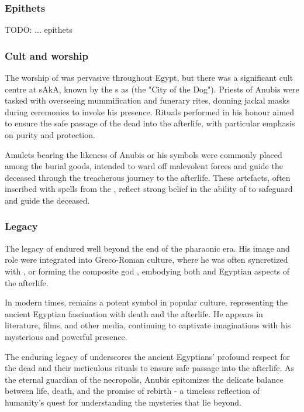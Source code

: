 \subsubsection*{Epithets}

TODO: ... epithets

\subsubsection*{Cult and worship}
The worship of  was pervasive throughout Egypt, but there was a significant cult centre at sAkA, known by the s as  (the "City of the Dog"). Priests of Anubis were tasked with overseeing mummification and funerary rites, donning jackal masks during ceremonies to invoke his presence. Rituals performed in his honour aimed to ensure the safe passage of the dead into the afterlife, with particular emphasis on purity and protection.

Amulets bearing the likeness of Anubis or his symbols were commonly placed among the burial goods, intended to ward off malevolent forces and guide the deceased through the treacherous journey to the afterlife. These artefacts, often inscribed with spells from the , reflect strong belief in the ability of  to safeguard and guide the deceased.

\subsubsection*{Legacy}
The legacy of  endured well beyond the end of the pharaonic era. His image and role were integrated into Greco-Roman culture, where he was often syncretized with , or forming the composite god , embodying both  and Egyptian aspects of the afterlife.

In modern times,  remains a potent symbol in popular culture, representing the ancient Egyptian fascination with death and the afterlife. He appears in literature, films, and other media, continuing to captivate imaginations with his mysterious and powerful presence.

The enduring legacy of  underscores the ancient Egyptians' profound respect for the dead and their meticulous rituals to ensure safe passage into the afterlife. As the eternal guardian of the necropolis, Anubis epitomizes the delicate balance between life, death, and the promise of rebirth - a timeless reflection of humanity's quest for understanding the mysteries that lie beyond.

